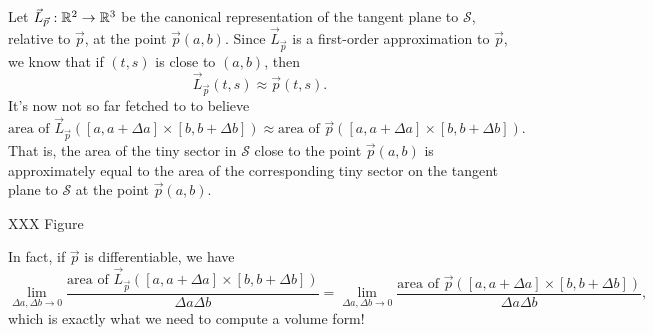 Let $\vec L_{\vec p}:\mathbb{R}^2\to\mathbb{R}^3$ be the canonical representation of the tangent plane to $\mathcal S$,
relative to $\vec p$, at the point $\vec p(a,b)$.  Since $\vec L_{\vec p}$ is a first-order
approximation to $\vec p$, we know that if $(t,s)$ is close to $(a,b)$, then
\[
	\vec L_{\vec p}(t,s)\approx \vec p(t,s).
\]
It's now not so far fetched to to believe
\[
	\text{area of }\vec L_{\vec p}([a,a+\Delta a]\times [b,b+\Delta b]) \approx
	\text{area of }\vec p([a,a+\Delta a]\times [b,b+\Delta b]).
\]
That is, the area of the tiny sector in $\mathcal S$ close to the point $\vec p(a,b)$
is approximately equal to the area of the corresponding
tiny sector on the tangent plane to $\mathcal S$ at the point $\vec p(a,b)$.

XXX Figure

In fact, if $\vec p$ is differentiable, we have
\[
	\lim_{\Delta a,\Delta b\to0} \frac{\text{area of }\vec L_{\vec p}([a,a+\Delta a]\times [b,b+\Delta b])}{\Delta a\Delta b}
	=
	\lim_{\Delta a,\Delta b\to0} \frac{\text{area of }\vec p([a,a+\Delta a]\times [b,b+\Delta b])}{\Delta a\Delta b},
\]
which is exactly what we need to compute a volume form!

\begin{exercises}
\end{exercises}
